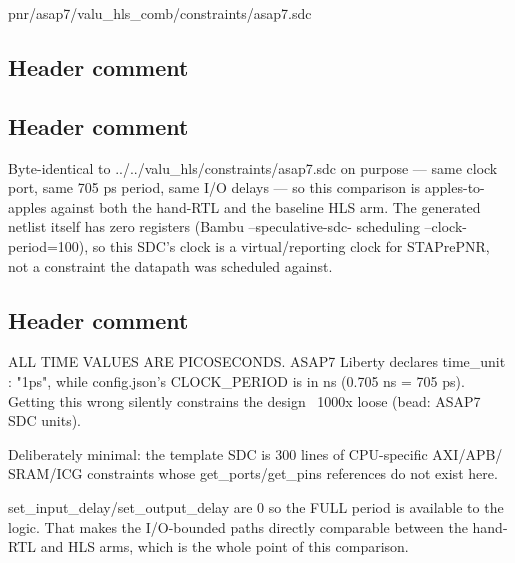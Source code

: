 \begin{relocated}{pnr/asap7/valu_hls_comb/constraints/asap7.sdc}

\subsection*{Header comment}


\subsection*{Header comment}

\begin{textblock}
Byte-identical to ../../valu_hls/constraints/asap7.sdc on purpose — same
clock port, same 705 ps period, same I/O delays — so this comparison is
apples-to-apples against both the hand-RTL and the baseline HLS arm. The
generated netlist itself has zero registers (Bambu --speculative-sdc-
scheduling --clock-period=100), so this SDC's clock is a virtual/reporting
clock for STAPrePNR, not a constraint the datapath was scheduled against.
\end{textblock}

\subsection*{Header comment}

\begin{textblock}
ALL TIME VALUES ARE PICOSECONDS. ASAP7 Liberty declares time_unit : "1ps",
while config.json's CLOCK_PERIOD is in ns (0.705 ns = 705 ps). Getting this
wrong silently constrains the design ~1000x loose (bead: ASAP7 SDC units).

Deliberately minimal: the template SDC is 300 lines of CPU-specific AXI/APB/
SRAM/ICG constraints whose get_ports/get_pins references do not exist here.

set_input_delay/set_output_delay are 0 so the FULL period is available to the
logic. That makes the I/O-bounded paths directly comparable between the
hand-RTL and HLS arms, which is the whole point of this comparison.
\end{textblock}

\end{relocated}

